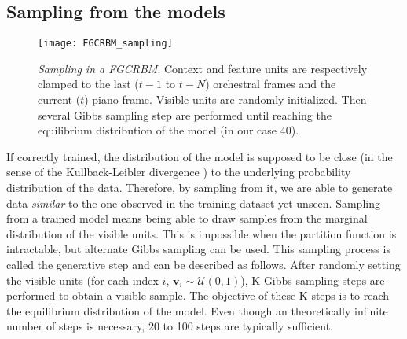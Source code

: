 \documentclass[letterpaper]{article}
\begin{document}

\subsection{Sampling from the models}
\begin{figure}
\centering
\texttt{[image: FGCRBM\_sampling]}
\caption{\textit{Sampling in a FGCRBM}. Context and feature units are respectively clamped to the last ($t-1$ to $t-N$) orchestral frames and the current ($t$) piano frame. Visible units are randomly initialized. Then several Gibbs sampling step are performed until reaching the equilibrium distribution of the model (in our case 40).}
\label{fig:FGCRBM_sampling}
\end{figure}
If correctly trained, the distribution of the model is supposed to be close (in the sense of the Kullback-Leibler divergence \cite{hinton2002training}) to the underlying probability distribution of the data. Therefore, by sampling from it, we are able to generate data \textit{similar} to the one observed in the training dataset yet unseen.
Sampling from a trained model means being able to draw samples from the marginal distribution of the visible units. This is impossible when the partition function is intractable, but alternate Gibbs sampling can be used. This sampling process is called the generative step and can be described as follows. After randomly setting the visible units (for each index $i$, $\bm{v}_{i} \sim \mathcal{U}(0,1)$), K Gibbs sampling steps are performed to obtain a visible sample. The objective of these K steps is to reach the equilibrium distribution of the model. Even though an theoretically  infinite number of steps is necessary, 20 to 100 steps are typically sufficient.
\end{document}
